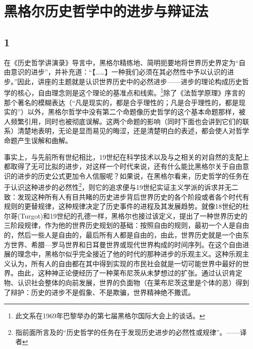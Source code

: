 \chapter{黑格尔历史哲学中的进步与辩证法}

\section*{1}

在《历史哲学讲演录》导言中，黑格尔精练地、简明扼要地将世界历史界定为“自由意识的进步”，并补充道：“【……】一种我们必须在其必然性中予以认识的进步。”因此，讲座的主题就是认识世界历史中的必然进步——进步的理论构成历史哲学的核心，自由理念则是这个理论的基准点和线索。\footnote{此文系在1969年巴黎举办的第七届黑格尔国际大会上的谈话。}除了《法哲学原理》序言的那个著名的模糊表达（“凡是现实的，都是合乎理性的；凡是合乎理性的，都是现实的”）以外，黑格尔哲学中没有第二个命题像历史哲学的这个基本命题那样，被人频繁引用，同时也被彻底误解。这两个命题的影响（同时下面也会讲到它们的联系）清楚地表明，无论是显而易见的晦涩，还是清楚明白的表述，都会使人对哲学命题产生误解和曲解。

事实上，与先前所有世纪相比，19世纪在科学技术以及与之相关的对自然的支配上都取得了无可比拟的进步，对这样一个时代来说，还有什么能比黑格尔关于自由意识的进步的历史公式更加令人信服呢？如果说，在黑格尔看来，历史哲学的任务在于认识这种进步的必然性\footnote{指前面所言及的“历史哲学的任务在于发现历史进步的必然性或规律”。——译者}，则它的追求便与19世纪实证主义学派的诉求并无二致：发现这种所有人有目共睹的历史进步背后世界历史的各个阶段或者各个时代有规则的更替规律，这种规律决定了历史事件的进程及其发展趋势。就像18世纪的杜尔哥(Turgot)和19世纪的孔德一样，黑格尔也接过该定义，提出了一种世界历史的三阶段规律，作为他的世界历史规划的基础：按照自由的规则，最初一个人是自由的，然后一些人是自由的，最后所有人都是自由的，由此，世界历史就是一个由东方世界、希腊—罗马世界和日耳曼世界或现代世界构成的时间序列。在这个自由进展的理念中，黑格尔似乎完全接近了他的时代的那种进步的乐观主义。这种乐观主义认为，所有人的自由都在其中得到实现的市民社会就是一切可能世界中最好的世界。由此，这种神正论便经历了一种莱布尼茨从未梦想过的扩张。通过认识肯定物、认识社会整体的向前发展，世界的负面物（在莱布尼茨这里是个体的恶）得到了辩护：历史的进步不是假象、不是欺骗，世界精神绝不撒谎。

